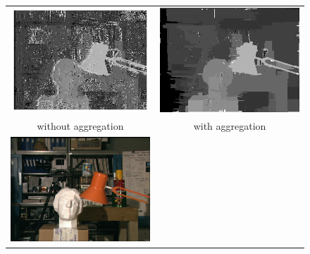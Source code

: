 \documentclass{article}
\begin{document}
\begin{figure}[h]
\begin{center}	
\begin{tabular}{cc}
\includegraphics[scale=0.51]{Images/ADCensus_only/disparity_map.png} & 
\includegraphics[scale=0.5]{Images/ADCensus_aggregated/disparity_map.png}
\\
without aggregation & with aggregation \\
\includegraphics[scale=0.5]{Images/tsukuba.png} &

\end{tabular}
\end{center}
\end{figure}
\end{document}
